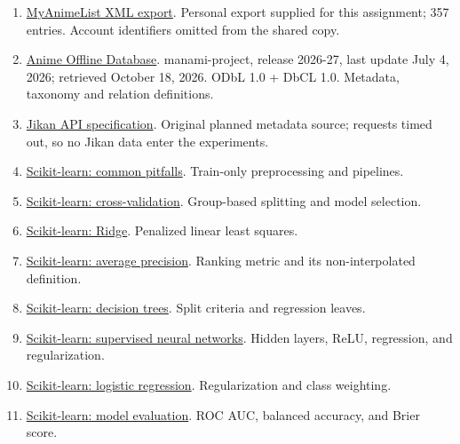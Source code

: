 \documentclass[10pt,a4paper]{article}
\begin{document}
\begin{enumerate}\small
\item \href{https://myanimelist.net/}{MyAnimeList XML export}. Personal export supplied for this assignment; 357 entries. Account identifiers omitted from the shared copy.
\item \href{https://github.com/manami-project/anime-offline-database}{Anime Offline Database}. manami-project, release 2026-27, last update July 4, 2026; retrieved October 18, 2026. ODbL 1.0 + DbCL 1.0. Metadata, taxonomy and relation definitions.
\item \href{https://github.com/jikan-me/jikan-rest/blob/master/storage/api-docs/api-docs.json}{Jikan API specification}. Original planned metadata source; requests timed out, so no Jikan data enter the experiments.
\item \href{https://scikit-learn.org/stable/common_pitfalls.html}{Scikit-learn: common pitfalls}. Train-only preprocessing and pipelines.
\item \href{https://scikit-learn.org/stable/modules/cross_validation.html}{Scikit-learn: cross-validation}. Group-based splitting and model selection.
\item \href{https://scikit-learn.org/stable/modules/generated/sklearn.linear_model.Ridge.html}{Scikit-learn: Ridge}. Penalized linear least squares.
\item \href{https://scikit-learn.org/stable/modules/generated/sklearn.metrics.average_precision_score.html}{Scikit-learn: average precision}. Ranking metric and its non-interpolated definition.

\item \href{https://scikit-learn.org/stable/modules/tree.html}{Scikit-learn: decision trees}. Split criteria and regression leaves.
\item \href{https://scikit-learn.org/stable/modules/neural_networks_supervised.html}{Scikit-learn: supervised neural networks}. Hidden layers, ReLU, regression, and regularization.
\item \href{https://scikit-learn.org/stable/modules/generated/sklearn.linear_model.LogisticRegression.html}{Scikit-learn: logistic regression}. Regularization and class weighting.
\item \href{https://scikit-learn.org/stable/modules/model_evaluation.html}{Scikit-learn: model evaluation}. ROC AUC, balanced accuracy, and Brier score.
\end{enumerate}
\end{document}
